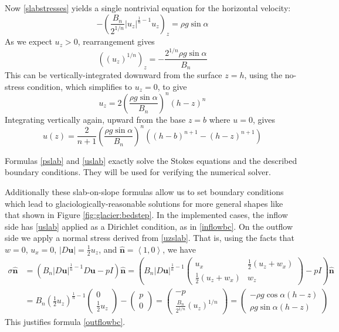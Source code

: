 \documentclass[letterpaper,final,12pt,reqno]{amsart}
\newcommand{\hbn}{\hat{\mathbf{n}}}
\newcommand{\bu}{\mathbf{u}}
\begin{document}
Now \eqref{slabstresses} yields a single nontrivial equation for the horizontal velocity:
    $$- \left(\frac{B_n}{2^{1/n}} |u_z|^{\frac{1}{n}-1} u_z\right)_z = \rho g\sin\alpha$$
As we expect $u_z>0$, rearrangement gives
    $$\left((u_z)^{1/n} \right)_z = - \frac{2^{1/n} \rho g\sin\alpha}{B_n}$$
This can be vertically-integrated downward from the surface $z=h$, using the no-stress condition, which simplifies to $u_z=0$, to give
\begin{equation}
u_z = 2 \left(\frac{\rho g\sin\alpha}{B_n}\right)^n (h-z)^n  \label{uzslab}
\end{equation}
Integrating vertically again, upward from the base $z=b$ where $u=0$, gives
\begin{equation}
u(z) = \frac{2}{n+1} \left(\frac{\rho g\sin\alpha}{B_n}\right)^n \left((h-b)^{n+1} - (h-z)^{n+1}\right)  \label{uslab}
\end{equation}

Formulas \eqref{pslab} and \eqref{uslab} exactly solve the Stokes equations and the described boundary conditions.  They will be used for verifying the numerical solver.

Additionally these slab-on-slope formulas allow us to set boundary conditions which lead to glaciologically-reasonable solutions for more general shapes like that shown in Figure \ref{fig:glacier:bedstep}.  In the implemented cases, the inflow side has \eqref{uslab} applied as a Dirichlet condition, as in \eqref{inflowbc}.  On the outflow side we apply a normal stress derived from \eqref{uzslab}.  That is, using the facts that $w=0$, $u_x=0$, $|D\bu| = \frac{1}{2} u_z$, and $\hbn=\left<1,0\right>$, we have
\begin{align*}
\sigma \hbn &= \left(B_n |D\bu|^{\frac{1}{n}-1} D\bu - pI\right)\hbn = \left(B_n |D\bu|^{\frac{1}{n}-1} \begin{pmatrix} u_x & \frac{1}{2}(u_z+w_x) \\ \frac{1}{2}(u_z+w_x) & w_z \end{pmatrix} - pI\right)\hbn \\
    &= B_n \left(\frac{1}{2} u_z\right)^{\frac{1}{n}-1} \begin{pmatrix} 0 \\ \frac{1}{2} u_z \end{pmatrix} - \begin{pmatrix} p \\ 0 \end{pmatrix} = \begin{pmatrix} - p \\ \frac{B_n}{2^{1/n}} (u_z)^{1/n} \end{pmatrix} = \begin{pmatrix} - \rho g\cos\alpha (h-z) \\ \rho g\sin\alpha (h-z) \end{pmatrix}
\end{align*}
This justifies formula \eqref{outflowbc}.
\end{document}
